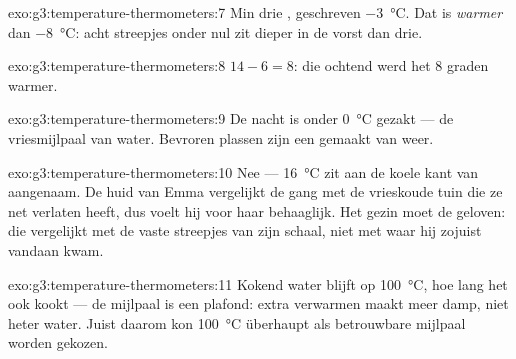 \begin{solution}{exo:g3:temperature-thermometers:7}
Min drie , geschreven \qty{-3}{\celsius}. Dat is
\emph{warmer} dan \qty{-8}{\celsius}: acht streepjes onder nul zit
dieper in de vorst dan drie.
\end{solution}

\begin{solution}{exo:g3:temperature-thermometers:8}
$14 - 6 = 8$: die ochtend werd het $8$ graden warmer.
\end{solution}

\begin{solution}{exo:g3:temperature-thermometers:9}
De nacht is onder \qty{0}{\celsius} gezakt --- de vriesmijlpaal van
water. Bevroren plassen zijn een  gemaakt van weer.
\end{solution}

\begin{solution}{exo:g3:temperature-thermometers:10}
Nee --- \qty{16}{\celsius} zit aan de koele kant van aangenaam. De
huid van Emma vergelijkt de gang met de vrieskoude tuin die ze net
verlaten heeft, dus voelt hij voor haar behaaglijk. Het gezin moet de
 geloven: die vergelijkt met de vaste streepjes van zijn
schaal, niet met waar hij zojuist vandaan kwam.
\end{solution}

\begin{solution}{exo:g3:temperature-thermometers:11}
Kokend water blijft op \qty{100}{\celsius}, hoe lang het ook kookt ---
de mijlpaal is een plafond: extra verwarmen maakt meer damp, niet
heter water. Juist daarom kon \qty{100}{\celsius} überhaupt als
betrouwbare mijlpaal worden gekozen.
\end{solution}
